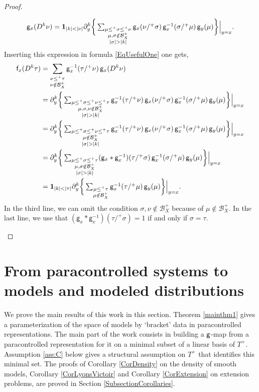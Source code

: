 \documentclass[10pt]{amsart}
\theoremstyle{plain}
\theoremstyle{definition}
\newcommand{\sff}{\mathsf{f}}
\newcommand{\sfg}{\mathsf{g}}
\newcommand{\mcB}{\mathcal{B}}
\begin{document}
\begin{proof}
\begin{itemize}
\[
\sfg_x(D^k\nu) = {\bf1}_{|k|<|\nu|}\partial_y^k \bigg\{\textstyle\sum_{\substack{\mu\le^+\sigma\le^+\nu \\ \mu,\sigma\notin\mcB_X^+\\|\sigma|>|k|}} \sfg_x(\nu/^+\sigma)\,\sfg_x^{-1}(\sigma/^+\mu)\,\sfg_y(\mu)\bigg\}\Big|_{y=x}.
\]
Inserting this expression in formula \eqref{EqUsefulOne} one gets,
\begin{align*}
\sff_x(D^k\tau)
&= \sum_{\substack{\nu\le^+\tau\\\nu\notin\mcB_X^+}} \sfg_x^{-1}(\tau/^+\nu)\,\sfg_x(D^k\nu) \\
&= \partial_y^k \bigg\{\textstyle\sum_{\substack{\mu\le^+\sigma\le^+\nu\le^+\tau \\ \mu,\sigma,\nu\notin\mcB_X^+\\|\sigma|>|k|}} \sfg_x^{-1}(\tau/^+\nu)\,\sfg_x(\nu/^+\sigma)\,\sfg_x^{-1}(\sigma/^+\mu)\,\sfg_y(\mu)\bigg\}\Big|_{y=x} \\
&= \partial_y^k \bigg\{\textstyle\sum_{\substack{\mu\le^+\sigma\le^+\nu\le^+\tau \\ \mu\notin\mcB_X^+\\|\sigma|>|k|}} \sfg_x^{-1}(\tau/^+\nu)\,\sfg_x(\nu/^+\sigma)\,\sfg_x^{-1}(\sigma/^+\mu)\,\sfg_y(\mu)\bigg\}\Big|_{y=x} \\
&= \partial_y^k \bigg\{\textstyle\sum_{\substack{\mu\le^+\sigma\le^+\tau \\ \mu,\sigma\notin\mcB_X^+\\|\sigma|>|k|}} (\sfg_x*\sfg_x^{-1})(\tau/^+\sigma)\,\sfg_x^{-1}(\sigma/^+\mu)\,\sfg_y(\mu)\bigg\}\Big|_{y=x} \\
&= {\bf1}_{|k|<|\tau|}\partial_y^k \bigg\{\textstyle\sum_{\substack{\mu\le^+\tau\\ \mu\notin\mcB_X^+}}\sfg_x^{-1}(\tau/^+\mu)\,\sfg_y(\mu)\bigg\}\Big|_{y=x}.
\end{align*}
In the third line, we can omit the condition $\sigma,\nu\notin\mcB_X^+$ because of $\mu\notin\mcB_X^+$.
In the last line, we use that $(\sfg_x*\sfg_x^{-1})(\tau/^+\sigma)=1$ if and only if $\sigma=\tau$.\qedhere
\end{itemize}
\end{proof}

\section{From paracontrolled systems to models and modeled distributions}
\label{SectionPCtoRS}

We prove the main results of this work in this section. Theorem \ref{mainthm1} gives a parameterization of the space of models by `bracket' data in paracontrolled representations. The main part of the work consists in building a $\sf g$-map from a paracontrolled representation for it on a minimal subset of a linear basis of $T^+$. Assumption \eqref{ass:C} below gives a structural assumption on $T^+$ that identifies this minimal set. The proofs of Corollary \ref{CorDensity} on the density of smooth models, Corollary \ref{CorLyonsVictoir} and Corollary \ref{CorExtension} on extension problems, are proved in Section \ref{SubsectionCorollaries}.
\end{document}

